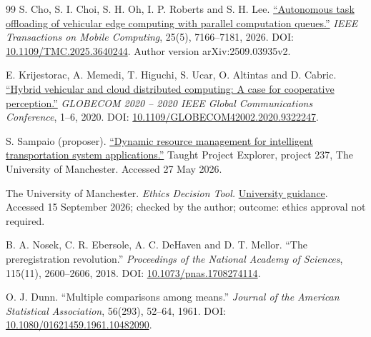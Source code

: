 \documentclass[12pt,a4paper]{article}
\begin{document}
\begin{thebibliography}{99}
 S. Cho, S. I. Choi, S. H. Oh, I. P. Roberts and S. H. Lee. \href{\detokenize{https://arxiv.org/abs/2509.03935v2}}{``Autonomous task offloading of vehicular edge computing with parallel computation queues.''} \emph{IEEE Transactions on Mobile Computing}, 25(5), 7166--7181, 2026. DOI: \href{\detokenize{https://doi.org/10.1109/TMC.2025.3640244}}{10.1109/TMC.2025.3640244}. Author version arXiv:2509.03935v2.

 E. Krijestorac, A. Memedi, T. Higuchi, S. Ucar, O. Altintas and D. Cabric. \href{\detokenize{https://arxiv.org/abs/2010.05693}}{``Hybrid vehicular and cloud distributed computing: A case for cooperative perception.''} \emph{GLOBECOM 2020 -- 2020 IEEE Global Communications Conference}, 1--6, 2020. DOI: \href{\detokenize{https://doi.org/10.1109/GLOBECOM42002.2020.9322247}}{10.1109/GLOBECOM42002.2020.9322247}.

 S. Sampaio (proposer). \href{\detokenize{https://digital.cs.manchester.ac.uk/taught-project-explorer/student/project-id-237}}{``Dynamic resource management for intelligent transportation system applications.''} Taught Project Explorer, project 237, The University of Manchester. Accessed 27 May 2026.

 The University of Manchester. \emph{Ethics Decision Tool.} \href{\detokenize{https://www.manchester.ac.uk/research/environment/governance/ethics/approval/}}{University guidance}. Accessed 15 September 2026; checked by the author; outcome: ethics approval not required.

 B. A. Nosek, C. R. Ebersole, A. C. DeHaven and D. T. Mellor. ``The preregistration revolution.'' \emph{Proceedings of the National Academy of Sciences}, 115(11), 2600--2606, 2018. DOI: \href{\detokenize{https://doi.org/10.1073/pnas.1708274114}}{10.1073/pnas.1708274114}.

 O. J. Dunn. ``Multiple comparisons among means.'' \emph{Journal of the American Statistical Association}, 56(293), 52--64, 1961. DOI: \href{\detokenize{https://doi.org/10.1080/01621459.1961.10482090}}{10.1080/01621459.1961.10482090}.


\end{thebibliography}
\end{document}
